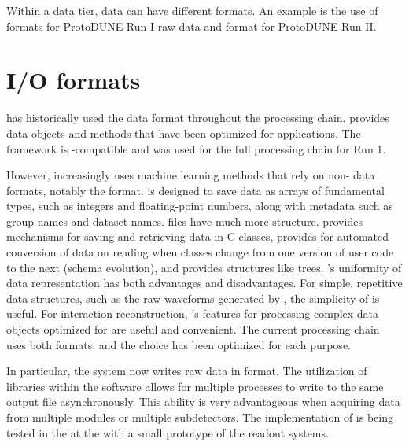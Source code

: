 \documentclass[../main-v1.tex]{subfiles}
\begin{document}
Within a data tier, data can have different formats.  An example is the use of  formats for ProtoDUNE Run I raw data and  format for ProtoDUNE Run II.

\section{I/O formats }
 has historically used the  data format throughout the processing chain.   provides data objects and methods that have been optimized for  applications.  The  framework is -compatible and  was used for the full processing chain for  Run 1. 

However,  increasingly uses   machine learning methods that rely on non- data formats, notably the  format.   is designed to save data as arrays of fundamental types, such as integers and floating-point numbers, along with metadata such as group names and dataset names.   files have much more structure.   provides mechanisms for saving and retrieving data in C\raisebox{1pt}{++} classes, provides for automated conversion of data on reading when classes change from one version of user code to the next (schema evolution), and provides structures like trees. 's uniformity of data representation has both advantages and disadvantages. For simple, repetitive data structures, such as the raw waveforms generated by , the simplicity of  is useful.  For interaction reconstruction, 's features for processing complex data objects optimized for  are useful and convenient.  The current  processing chain uses both formats, and the choice has been optimized for each purpose.

In particular, the   system now writes raw data in  format. The utilization of  libraries within the  software allows for multiple processes to write to the same output file asynchronously. This ability is very advantageous when acquiring data from multiple  modules or multiple  subdetectors. The implementation of  is being tested %
in the  \coldbox at the  with a small prototype of the %
  readout systems. 
\end{document}
